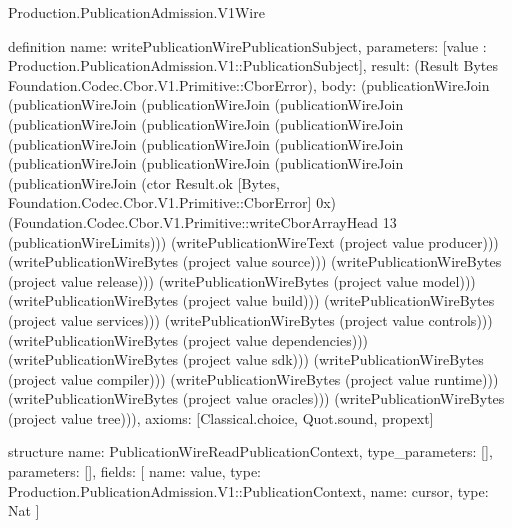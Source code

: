 \begin{lexlean}{Production.PublicationAdmission.V1Wire}
\begin{semanticmodule}
definition{
  name: writePublicationWirePublicationSubject,
  parameters: [value : Production.PublicationAdmission.V1::PublicationSubject],
  result: (Result Bytes Foundation.Codec.Cbor.V1.Primitive::CborError),
  body: (publicationWireJoin (publicationWireJoin (publicationWireJoin (publicationWireJoin (publicationWireJoin (publicationWireJoin (publicationWireJoin (publicationWireJoin (publicationWireJoin (publicationWireJoin (publicationWireJoin (publicationWireJoin (publicationWireJoin (publicationWireJoin (ctor Result.ok [Bytes, Foundation.Codec.Cbor.V1.Primitive::CborError] 0x) (Foundation.Codec.Cbor.V1.Primitive::writeCborArrayHead 13 (publicationWireLimits))) (writePublicationWireText (project value producer))) (writePublicationWireBytes (project value source))) (writePublicationWireBytes (project value release))) (writePublicationWireBytes (project value model))) (writePublicationWireBytes (project value build))) (writePublicationWireBytes (project value services))) (writePublicationWireBytes (project value controls))) (writePublicationWireBytes (project value dependencies))) (writePublicationWireBytes (project value sdk))) (writePublicationWireBytes (project value compiler))) (writePublicationWireBytes (project value runtime))) (writePublicationWireBytes (project value oracles))) (writePublicationWireBytes (project value tree))),
  axioms: [Classical.choice, Quot.sound, propext]
}

structure{
  name: PublicationWireReadPublicationContext,
  type_parameters: [],
  parameters: [],
  fields: [
    {name: value, type: Production.PublicationAdmission.V1::PublicationContext},
    {name: cursor, type: Nat}
  ]
}


\end{semanticmodule}
\end{lexlean}
